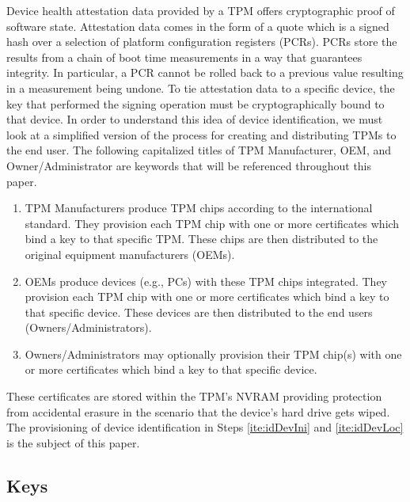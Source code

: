 Device health attestation data provided by a TPM offers cryptographic proof of software state. Attestation data comes in the form of a quote which is a signed hash over a selection of platform configuration registers (PCRs). PCRs store the results from a chain of boot time measurements in a way that guarantees integrity. In particular, a PCR cannot be rolled back to a previous value resulting in a measurement being undone. To tie attestation data to a specific device, the key that performed the signing operation must be cryptographically bound to that device. In order to understand this idea of device identification, we must look at a simplified version of the process for creating and distributing TPMs to the end user. The following capitalized titles of TPM Manufacturer, OEM, and Owner/Administrator are keywords that will be referenced throughout this paper. 
\begin{enumerate}
  \item\label{ite:idTPM} TPM Manufacturers produce TPM chips according to the international standard. They provision each TPM chip with one or more certificates which bind a key to that specific TPM. These chips are then distributed to the original equipment manufacturers (OEMs).
  \item\label{ite:idDevIni} OEMs produce devices (e.g., PCs) with these TPM chips integrated. They provision each TPM chip with one or more certificates which bind a key to that specific device. These devices are then distributed to the end users (Owners/Administrators).
  \item\label{ite:idDevLoc} Owners/Administrators may optionally provision their TPM chip(s) with one or more certificates which bind a key to that specific device.
\end{enumerate} 
These certificates are stored within the TPM's NVRAM providing protection from accidental erasure in the scenario that the device's hard drive gets wiped. The provisioning of device identification in Steps \ref{ite:idDevIni} and \ref{ite:idDevLoc} is the subject of this paper.






\subsection{Keys}

